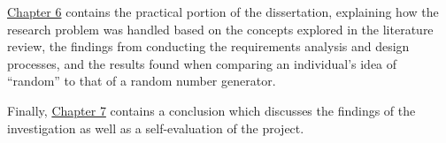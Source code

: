 \hyperref[section:Practical]{Chapter 6} contains the practical portion of the dissertation, explaining how the research problem was handled based on the concepts explored in the literature review, the findings from conducting the requirements analysis and design processes, and the results found when comparing an individual's idea of ``random'' to that of a random number generator.

Finally, \hyperref[section:Conclusion]{Chapter 7} contains a conclusion which discusses the findings of the investigation as well as a self-evaluation of the project.